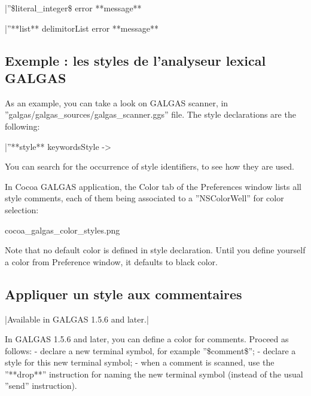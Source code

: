 {|''\$literal\_integer\$ error **message** %

|''**list** delimitorList error **message** %

\subsection{Exemple : les styles de l'analyseur lexical GALGAS}

As an example, you can take a look on GALGAS scanner, in ''galgas/galgas\_sources/galgas\_scanner.ggs'' file. The style declarations are the following:

|''**style** keywordsStyle -> %

You can search for the occurrence of style identifiers, to see how they are used.

In Cocoa GALGAS application, the Color tab of the Preferences window lists all style comments, each of them being associated to a ''NSColorWell'' for color selection:

{{cocoa\_galgas\_color\_styles.png}}

Note that no default color is defined in style declaration. Until you define yourself a color from Preference window, it defaults to black color.

\subsection{Appliquer un style aux commentaires}
|Available in GALGAS 1.5.6 and later.|

In GALGAS 1.5.6 and later, you can define a color for comments. Proceed as follows:
  - declare a new terminal symbol, for example ''\$comment\$'';
  - declare a style for this new terminal symbol;
  - when a comment is scanned, use the ''**drop**'' instruction for naming the new terminal symbol (instead of the usual ''send'' instruction).

}
